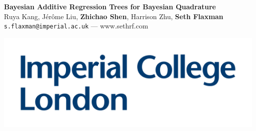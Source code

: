\documentclass[a0,portrait]{a0poster}
\begin{document}


\begin{minipage}[b]{0.75\linewidth}
\VeryHuge \color{NavyBlue} \textbf{Bayesian Additive Regression Trees for Bayesian Quadrature} \color{Black}\\ %
\huge 
	Ruya Kang, J\'er\^{o}me Liu, \textbf{Zhichao Shen}, Harrison Zhu, \textbf{Seth Flaxman}\\[0.5cm] %
\Large \texttt{s.flaxman@imperial.ac.uk} --- www.sethrf.com \\
\end{minipage}
%
\begin{minipage}[b]{0.25\linewidth}
\includegraphics[width=18cm]{icl}\ 
\end{minipage}

\vspace{-1cm} %

\end{document}
